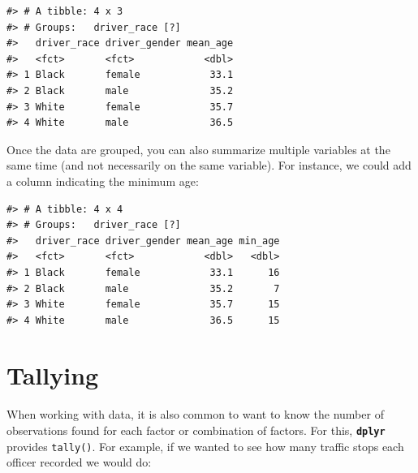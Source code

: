 \documentclass[]{book}
\newenvironment{Shaded}{\begin{snugshade}}{\end{snugshade}}
\newcommand{\DataTypeTok}[1]{\textcolor[rgb]{0.13,0.29,0.53}{#1}}
\newcommand{\KeywordTok}[1]{\textcolor[rgb]{0.13,0.29,0.53}{\textbf{#1}}}
\newcommand{\NormalTok}[1]{#1}
\newcommand{\OperatorTok}[1]{\textcolor[rgb]{0.81,0.36,0.00}{\textbf{#1}}}
\newcommand{\OtherTok}[1]{\textcolor[rgb]{0.56,0.35,0.01}{#1}}
\newcommand{\StringTok}[1]{\textcolor[rgb]{0.31,0.60,0.02}{#1}}
\begin{document}
\begin{verbatim}
#> # A tibble: 4 x 3
#> # Groups:   driver_race [?]
#>   driver_race driver_gender mean_age
#>   <fct>       <fct>            <dbl>
#> 1 Black       female            33.1
#> 2 Black       male              35.2
#> 3 White       female            35.7
#> 4 White       male              36.5
\end{verbatim}

Once the data are grouped, you can also summarize multiple variables at the same
time (and not necessarily on the same variable). For instance, we could add a
column indicating the minimum age:

\begin{Shaded}
\end{Shaded}

\begin{verbatim}
#> # A tibble: 4 x 4
#> # Groups:   driver_race [?]
#>   driver_race driver_gender mean_age min_age
#>   <fct>       <fct>            <dbl>   <dbl>
#> 1 Black       female            33.1      16
#> 2 Black       male              35.2       7
#> 3 White       female            35.7      15
#> 4 White       male              36.5      15
\end{verbatim}

\hypertarget{tallying}{%
\section{Tallying}\label{tallying}}

When working with data, it is also common to want to know the number of
observations found for each factor or combination of factors. For this, \textbf{\texttt{dplyr}}
provides \texttt{tally()}. For example, if we wanted to see how many traffic stops each officer recorded we would do:
\end{document}
